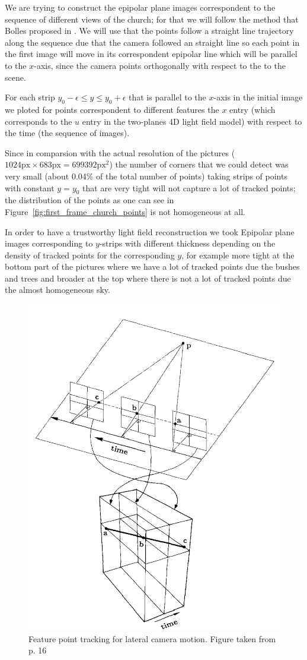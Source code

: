 \bigskip

We are trying to construct the epipolar plane images correspondent to the sequence of different views of the church; for that we will follow the method that Bolles proposed in \cite{Bolles}. We will use that the points follow a straight line trajectory along the sequence due that the camera followed an straight line so each point in the first image will move in its correspondent epipolar line which will be parallel to the $x$-axis, since the camera points orthogonally with respect to the to the scene. 

\bigskip

For each strip $y_0-\epsilon \leq y \leq y_0+\epsilon$ that is parallel to the $x$-axis in the initial image we ploted for points correspondent to different features the $x$ entry (which corresponds to the $u$ entry in the two-planes 4D light field model) with respect to the time (the sequence of images).

\bigskip

Since in comparsion with the actual resolution of the pictures ($1024\text{px}\times 683\text{px}=699392\text{px}^2$) the number of corners that we could detect was very small (about 0.04\% of the total number of points) taking strips of points with constant $y=y_0$ that are very tight will not capture a lot of tracked points; the distribution of the points as one can see in Figure~\ref{fig:first_frame_church_points} is not homogeneous at all. 

\bigskip

In order to have a trustworthy light field reconstruction we took Epipolar plane images corresponding to $y$-strips with different thickness depending on the density of tracked points for the corresponding $y$, for example more tight at the bottom part of the pictures where we have a lot of tracked points due the bushes and trees and  broader at the top where there is not a lot of tracked points due the almost homogeneous sky.

\begin{figure}[h!]
\centering
\includegraphics[width = 0.6 \textwidth]{./Diagrams/lateral_motion_epi.jpg}
\caption{Feature point tracking for lateral camera motion. Figure taken from \cite{Bolles} p. 16}
\label{lateral_motion_epi}
\end{figure}

